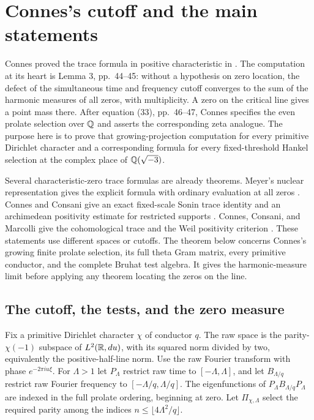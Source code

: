 \section{Connes's cutoff and the main statements}
\label{sec:introduction}
Connes proved the trace formula in positive characteristic in
\citet[Section VIII, Theorem 5, p.~42]{connes1999}. The computation
at its heart is Lemma 3, pp.~44--45: without a hypothesis on zero
location, the defect of the simultaneous time and frequency cutoff
converges to the sum of the harmonic measures of all zeros, with
multiplicity. A zero on the critical line gives a point mass there.
After equation (33), pp.~46--47, Connes specifies the even prolate
selection over $\mathbb Q$ and asserts the corresponding zeta analogue.
The purpose here is to prove that growing-projection computation
for every primitive Dirichlet character and a corresponding formula
for every fixed-threshold Hankel selection at the complex place of
$\mathbb Q(\sqrt{-3})$.

Several characteristic-zero trace formulas are already theorems.
Meyer's nuclear representation gives the explicit formula with
ordinary evaluation at all zeros
\citep[Theorems~5.8 and 5.11, pp.~43, 47]{meyer2005}.
Connes and Consani give an exact fixed-scale Sonin trace identity
and an archimedean positivity estimate for restricted supports
\citep[Theorems~4.7 and 6.11, pp.~27, 48]{cc2020}.
Connes, Consani, and Marcolli give the cohomological trace and the
Weil positivity criterion
\citep[Theorem~6.1, Proposition~6.2, Corollary~6.3,
pp.~28--29]{ccm2007}.
These statements use different spaces or cutoffs. The theorem below
concerns Connes's growing finite prolate selection, its full theta
Gram matrix, every primitive conductor, and the complete Bruhat
test algebra. It gives the harmonic-measure limit before applying
any theorem locating the zeros on the line.

\subsection{The cutoff, the tests, and the zero measure}
Fix a primitive Dirichlet character $\chi$ of conductor $q$.
The raw space is the parity-$\chi(-1)$ subspace of $L^2(\mathbb R,du)$,
with its squared norm divided by two, equivalently the positive-half-line
norm. Use the raw Fourier transform with phase $e^{-2\pi iu\xi}$.
For $\Lambda>1$ let $P_\Lambda$ restrict raw time to
$[-\Lambda,\Lambda]$, and let $B_{\Lambda/q}$ restrict raw
Fourier frequency to $[-\Lambda/q,\Lambda/q]$.
The eigenfunctions of
$P_\Lambda B_{\Lambda/q}P_\Lambda$ are indexed in the full
prolate ordering, beginning at zero. Let $\Pi_{\chi,\Lambda}$
select the required parity among the indices
$n\leq\lfloor4\Lambda^2/q\rfloor$.

